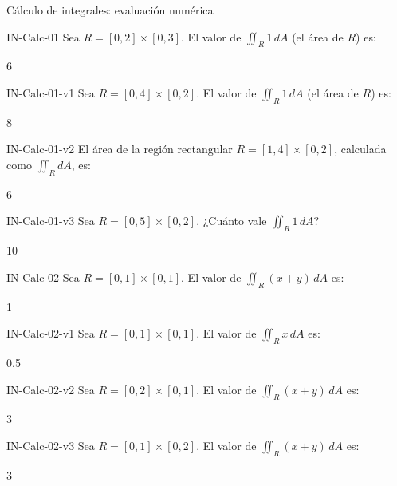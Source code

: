 \documentclass[a4,11pt]{aleph-notas}
\begin{document}
\begin{quiz}{Cálculo de integrales: evaluación numérica}

\begin{numerical}[tolerance=0.01]%
    {IN-Calc-01}
    Sea $R = [0,2]\times[0,3]$. El valor de $\displaystyle\iint_R 1\,dA$ (el área de $R$) es:
    \item 6
\end{numerical}

\begin{numerical}[tolerance=0.01]%
    {IN-Calc-01-v1}
    Sea $R = [0,4]\times[0,2]$. El valor de $\displaystyle\iint_R 1\,dA$ (el área de $R$) es:
    \item 8
\end{numerical}

\begin{numerical}[tolerance=0.01]%
    {IN-Calc-01-v2}
    El área de la región rectangular $R=[1,4]\times[0,2]$, calculada como $\displaystyle\iint_R dA$, es:
    \item 6
\end{numerical}

\begin{numerical}[tolerance=0.01]%
    {IN-Calc-01-v3}
    Sea $R = [0,5]\times[0,2]$. ¿Cuánto vale $\displaystyle\iint_R 1\,dA$?
    \item 10
\end{numerical}

\begin{numerical}[tolerance=0.01]%
    {IN-Calc-02}
    Sea $R = [0,1]\times[0,1]$. El valor de $\displaystyle\iint_R (x+y)\,dA$ es:
    \item 1
\end{numerical}

\begin{numerical}[tolerance=0.01]%
    {IN-Calc-02-v1}
    Sea $R = [0,1]\times[0,1]$. El valor de $\displaystyle\iint_R x\,dA$ es:
    \item 0.5
\end{numerical}

\begin{numerical}[tolerance=0.01]%
    {IN-Calc-02-v2}
    Sea $R = [0,2]\times[0,1]$. El valor de $\displaystyle\iint_R (x+y)\,dA$ es:
    \item 3
\end{numerical}

\begin{numerical}[tolerance=0.01]%
    {IN-Calc-02-v3}
    Sea $R = [0,1]\times[0,2]$. El valor de $\displaystyle\iint_R (x+y)\,dA$ es:
    \item 3
\end{numerical}


\end{quiz}
\end{document}
